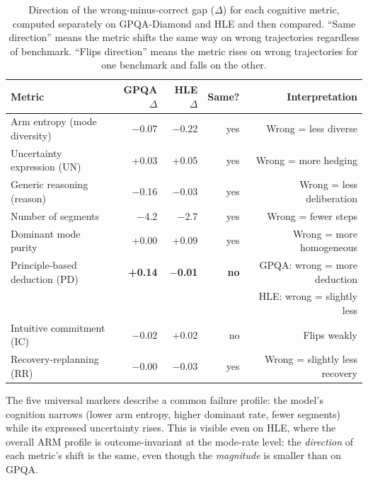 \begin{table}[t]
\centering
\small
\caption{%
  Direction of the wrong-minus-correct gap ($\Delta$) for each cognitive
  metric, computed separately on GPQA-Diamond and HLE and then compared.
  ``Same direction'' means the metric shifts the same way on wrong
  trajectories regardless of benchmark.
  ``Flips direction'' means the metric rises on wrong trajectories for one
  benchmark and falls on the other.
}
\label{tab:arm-cross-direction}
\setlength{\tabcolsep}{4pt}
\begin{tabular}{lrrrr}
\toprule
Metric & GPQA $\Delta$ & HLE $\Delta$ & Same? & Interpretation \\
\midrule
Arm entropy (mode diversity)    & $-$0.07 & $-$0.22 & yes & Wrong = less diverse \\
Uncertainty expression (UN)     & +0.03   & +0.05   & yes & Wrong = more hedging \\
Generic reasoning (reason)      & $-$0.16 & $-$0.03 & yes & Wrong = less deliberation \\
Number of segments              & $-$4.2  & $-$2.7  & yes & Wrong = fewer steps \\
Dominant mode purity            & +0.00   & +0.09   & yes & Wrong = more homogeneous \\
\midrule
Principle-based deduction (PD)  & \textbf{+0.14} & \textbf{$-$0.01} & \textbf{no} & GPQA: wrong = more deduction \\
                                &         &         &      & HLE: wrong = slightly less \\
Intuitive commitment (IC)       & $-$0.02 & +0.02   & no   & Flips weakly \\
Recovery-replanning (RR)        & $-$0.00 & $-$0.03 & yes  & Wrong = slightly less recovery \\
\bottomrule
\end{tabular}
\end{table}


The five universal markers describe a common failure profile: the model's
cognition narrows (lower arm entropy, higher dominant rate, fewer segments)
while its expressed uncertainty rises.
This is visible even on HLE, where the overall ARM profile is
outcome-invariant at the mode-rate level: the \emph{direction} of each
metric's shift is the same, even though the \emph{magnitude} is smaller
than on GPQA.


